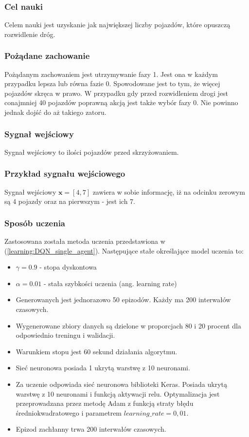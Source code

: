 \documentclass[12pt]{book}
\theoremstyle{plain}
\newcommand{\myref}[1]{(\ref{#1})}
\begin{document}
\subsubsection*{Cel nauki}
Celem nauki jest uzyskanie jak największej liczby pojazdów, które opuszczą rozwidlenie dróg.
\subsubsection*{Pożądane zachowanie}
Pożądanym zachowaniem jest utrzymywanie fazy 1. Jest ona w każdym przypadku lepsza lub równa fazie 0. Spowodowane jest to tym, że więcej pojazdów skręca w prawo. W przypadku gdy przed rozwidleniem drogi jest conajmniej 40 pojazdów poprawną akcją jest także wybór fazy 0. Nie powinno jednak dojść do aż takiego zatoru.
\subsubsection*{Sygnał wejściowy}
Sygnał wejściowy to ilości pojazdów przed skrzyżowaniem.
\subsubsection*{Przykład sygnału wejściowego}
Sygnał wejściowy $ \textbf{x}=[4,7] $ zawiera w sobie informację, iż na odcinku zerowym są 4 pojazdy oraz na pierwszym - jest ich 7. 
\subsubsection*{Sposób uczenia}
Zastosowana została metoda uczenia przedstawiona w \myref{learning:DQN_single_agent}. Następujące stałe określające model uczenia to:
\begin{itemize}
	\item $\gamma = 0.9$ - stopa dyskontowa
	\item $\alpha = 0.01$ - stała szybkości uczenia (ang. learning rate)
	\item Generowanych jest jednorazowo 50 epizodów. Każdy ma 200 interwałów czasowych.
	\item Wygenerowane zbiory danych są dzielone w proporcjach 80 i 20 procent dla odpowiednio treningu i walidacji.
	\item Warunkiem stopu jest 60 sekund działania algorytmu.
	\item Sieć neuronowa posiada 1 ukrytą warstwę z 10 neuronami.
	\item Za uczenie odpowiada sieć neuronowa biblioteki Keras. Posiada ukrytą warstwę z 10 neuronami i funkcją aktywacji relu. Optymalizacja jest przeprowadzana przez metodę Adam z funkcją straty błędu średniokwadratowego i parametrem $learning\_rate = 0,01$. 
	\item Epizod zachłanny trwa 200 interwałów czasowych.
\end{itemize}
\end{document}
